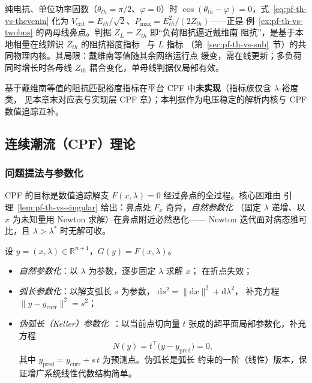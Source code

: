 \begin{remark}\label{rem:pf-th-vs-thevenin}
纯电抗、单位功率因数（$\theta_{th}=\pi/2$、$\varphi=0$）时
$\cos(\theta_{th}-\varphi)=0$，式~\eqref{eq:pf-th-vs-thevenin} 化为
$V_{\mathrm{crit}}=E_{th}/\sqrt2$、$P_{\max}=E_{th}^2/(2Z_{th})$——正是
例~\ref{ex:pf-th-vs-twobus} 的两母线鼻点。判据 $Z_L=Z_{th}$ 即“负荷阻抗逼近戴维南
阻抗”，是基于本地相量在线辨识 $Z_{th}$ 的阻抗裕度指标~\cite{pfvs:vu} 与 $L$ 指标
（第~\ref{sec:pf-th-vs-snb}~节）的共同物理内核。其局限：戴维南等值随其余网络运行点
缓变，需在线更新；多负荷同时增长时各母线 $Z_{th}$ 耦合变化，单母线判据仅局部有效。
\end{remark}

\begin{gapnote}
基于戴维南等值的阻抗匹配裕度指标在平台 CPF 中\textbf{未实现}（指标族仅含 $\lambda$-裕度类，
见本章末对应表与实现层 CPF 章）；本判据作为电压稳定的解析内核与 CPF 数值追踪互补。
\end{gapnote}

\subsection{连续潮流（CPF）理论}\label{sec:pf-th-vs-cpf}

\subsubsection{问题提法与参数化}
CPF 的目标是数值追踪解支 $F(x,\lambda)=0$ 经过鼻点的全过程。核心困难由
引理~\ref{lem:pf-th-vs-singular} 给出：鼻点处 $F_x$ 奇异，\emph{自然参数化}
（固定 $\lambda$ 递增、以 $x$ 为未知量用 Newton 求解）在鼻点附近必然恶化——
Newton 迭代面对病态雅可比，且 $\lambda>\lambda^*$ 时无解可收。

\begin{definition}[三种参数化]\label{def:pf-th-vs-param}
设 $y=(x,\lambda)\in\mathbb{R}^{n+1}$，$G(y)=F(x,\lambda)$。
\begin{itemize}
  \item \emph{自然参数化}：以 $\lambda$ 为参数，逐步固定 $\lambda$ 求解 $x$；
        在折点失效；
  \item \emph{弧长参数化}：以解支弧长 $s$ 为参数，
        $\mathrm{d}s^{2}=\|\mathrm{d}x\|^{2}+\mathrm{d}\lambda^{2}$，
        补充方程 $\|y-y_{\mathrm{curr}}\|^{2}=s^{2}$；
  \item \emph{伪弧长（Keller）参数化}~\cite{pfvs:keller}：以当前点切向量 $t$
        张成的超平面局部参数化，补充方程
        \begin{equation}
        N(y)=t^{\top}\bigl(y-y_{\mathrm{pred}}\bigr)=0,
        \end{equation}
        其中 $y_{\mathrm{pred}}=y_{\mathrm{curr}}+s\,t$ 为预测点。伪弧长是弧长
        约束的一阶（线性）版本，保证增广系统线性代数结构简单。
    \end{itemize}
\end{definition}

